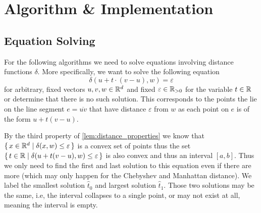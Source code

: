 \section{Algorithm \& Implementation}
\label{sec:algorithm_implementation}


\subsection{Equation Solving}
\label{subsec:equation_solving}
For the following algorithms we need to solve equations involving distance functions \(\delta\). More specifically, we want to solve the following equation 
\begin{equation}
  \delta(u + t \cdot (v - u), w) = \varepsilon \label{eq:eq_solve_main}
\end{equation}
for arbitrary, fixed vectors \(u, v, w \in \mathbb{R}^d\) and fixed \(\varepsilon \in \mathbb{R}_{>0}\) for the variable \(t \in \mathbb{R}\) or determine that there is no such solution. This corresponds to the points the lie on the line segment \(e = \overline{uv}\) that have distance \(\varepsilon\) from \(w\) as each point on \(e\) is of the form \(u + t(v-u)\). 

By the third property of \cref{lem:distance_properties} we know that \(\set{x \in \mathbb{R}^d \mid \delta(x, w) \leq \varepsilon}\) is a convex set of points thus the set \(\set{t \in \mathbb{R}\mid \delta(u + t(v-u), w) \leq \varepsilon}\) is also convex and thus an interval \([a, b]\). Thus we only need to find the first and last solution to this equation even if there are more (which may only happen for the Chebyshev and Manhattan distance). We label the smallest solution \(\hat{t}_0\) and largest solution \(\hat{t}_1\). Those two solutions may be the same, i.e, the interval collapses to a single point, or may not exist at all, meaning the interval is empty.

